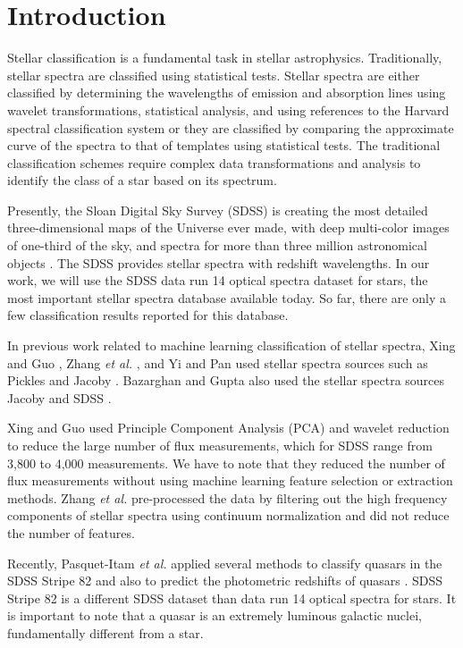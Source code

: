 \documentclass[conference]{IEEEtran}
\begin{document}
\section{Introduction}\label{sec:intro}

Stellar classification is a fundamental task in stellar astrophysics. Traditionally, stellar spectra are classified using statistical
tests. Stellar spectra are either classified by determining the wavelengths of emission and absorption lines using wavelet
transformations, statistical analysis, and using references to the Harvard spectral classification system or they are classified
by comparing the approximate curve of the spectra to that of templates using statistical tests. The traditional classification
schemes require complex data transformations and analysis to identify the class of a star based on its spectrum.

Presently, the Sloan Digital Sky Survey (SDSS) is creating the most detailed three-dimensional maps of the Universe ever
made, with deep multi-color images of one-third of the sky, and spectra for more than three million astronomical objects \cite{sdss}. The SDSS provides stellar spectra with redshift wavelengths.  In our work, we will use the SDSS data run 14 optical spectra dataset for stars, the most important stellar spectra database available today. So far, there are only a few classification results reported for this database.

In previous work related to machine learning classification of stellar spectra, Xing and Guo \cite{Xing}, Zhang \textit{et al.} \cite{Luo}, and Yi and Pan \cite{YI} used stellar spectra sources such as Pickles \cite{Pickles} and Jacoby \cite{Jacoby}. Bazarghan and Gupta \cite{Bazarghan} also used the stellar spectra sources Jacoby and SDSS \cite{York}. 

Xing and Guo \cite{Xing} used Principle Component Analysis (PCA) and wavelet reduction to reduce the large number of flux measurements, which for SDSS range from 3,800 to 4,000 measurements. We have to note that they reduced the number of flux measurements without using  machine learning feature selection or extraction methods. Zhang \textit{et al.} \cite{Luo} pre-processed the data by filtering out the high frequency components of stellar spectra using continuum normalization and did not reduce the number of features.  

Recently, Pasquet-Itam \textit{et al.} applied several methods to classify quasars in the SDSS Stripe 82 and also to predict the photometric redshifts of quasars \cite{Pasquet2018}. SDSS Stripe 82 is a different SDSS dataset than data run 14 optical spectra for stars. It is important to note that a quasar is an extremely luminous galactic nuclei, fundamentally different from a star. 
\end{document}
